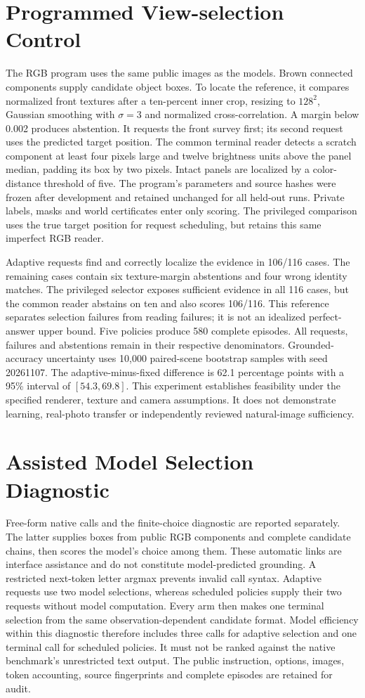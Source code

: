 \section{Programmed View-selection Control}
The RGB program uses the same public images as the models.
Brown connected components supply candidate object boxes.
To locate the reference, it compares normalized front textures after a ten-percent inner crop, resizing to $128^2$, Gaussian smoothing with $\sigma=3$ and normalized cross-correlation.
A margin below 0.002 produces abstention.
It requests the front survey first; its second request uses the predicted target position.
The common terminal reader detects a scratch component at least four pixels large and twelve brightness units above the panel median, padding its box by two pixels.
Intact panels are localized by a color-distance threshold of five.
The program's parameters and source hashes were frozen after development and retained unchanged for all held-out runs.
Private labels, masks and world certificates enter only scoring.
The privileged comparison uses the true target position for request scheduling, but retains this same imperfect RGB reader.

Adaptive requests find and correctly localize the evidence in 106/116 cases.
The remaining cases contain six texture-margin abstentions and four wrong identity matches.
The privileged selector exposes sufficient evidence in all 116 cases, but the common reader abstains on ten and also scores 106/116.
This reference separates selection failures from reading failures; it is not an idealized perfect-answer upper bound.
Five policies produce 580 complete episodes.
All requests, failures and abstentions remain in their respective denominators.
Grounded-accuracy uncertainty uses 10,000 paired-scene bootstrap samples with seed 20261107.
The adaptive-minus-fixed difference is 62.1 percentage points with a 95\% interval of $[54.3,69.8]$.
This experiment establishes feasibility under the specified renderer, texture and camera assumptions.
It does not demonstrate learning, real-photo transfer or independently reviewed natural-image sufficiency.

\section{Assisted Model Selection Diagnostic}
Free-form native calls and the finite-choice diagnostic are reported separately.
The latter supplies boxes from public RGB components and complete candidate chains, then scores the model's choice among them.
These automatic links are interface assistance and do not constitute model-predicted grounding.
A restricted next-token letter argmax prevents invalid call syntax.
Adaptive requests use two model selections, whereas scheduled policies supply their two requests without model computation.
Every arm then makes one terminal selection from the same observation-dependent candidate format.
Model efficiency within this diagnostic therefore includes three calls for adaptive selection and one terminal call for scheduled policies.
It must not be ranked against the native benchmark's unrestricted text output.
The public instruction, options, images, token accounting, source fingerprints and complete episodes are retained for audit.

